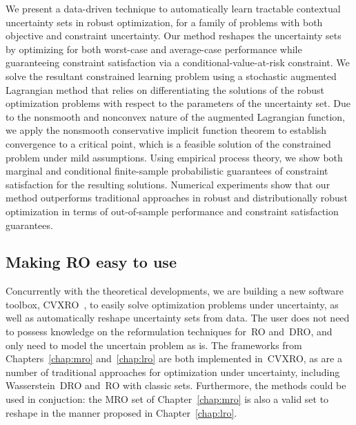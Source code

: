 We present a data-driven technique to automatically learn tractable contextual uncertainty sets in robust optimization, for a family of problems with both objective and constraint uncertainty. 
Our method reshapes the uncertainty sets by optimizing for both worst-case and average-case performance while guaranteeing constraint satisfaction via a conditional-value-at-risk constraint.
We solve the resultant constrained learning problem using a stochastic augmented Lagrangian method that relies on differentiating the solutions of the robust optimization problems with respect to the parameters of the uncertainty set.
Due to the nonsmooth and nonconvex nature of the augmented Lagrangian function, we apply the nonsmooth conservative implicit function theorem to establish convergence to a critical point, which is a feasible solution of the constrained problem under mild assumptions.
Using empirical process theory, we show both marginal and conditional finite-sample probabilistic guarantees of constraint satisfaction for the resulting solutions.
Numerical experiments show that our method outperforms traditional approaches in robust and distributionally robust optimization in terms of out-of-sample performance and constraint satisfaction guarantees.

\subsection{Making \gls{RO} easy to use}
Concurrently with the theoretical developments, we are building a new software toolbox, \Gls{CVXRO}~\cite{lropt_package}, 
to easily solve optimization problems under uncertainty, as well as automatically reshape uncertainty sets from data. 
The user does not need to possess knowledge on the reformulation techniques for~\gls{RO} and~\gls{DRO}, and only need to model the uncertain problem as is. 
The frameworks from Chapters~\ref{chap:mro} and~\ref{chap:lro} are both implemented in~\gls{CVXRO}, as are a number of traditional approaches for optimization under uncertainty, including Wasserstein~\gls{DRO} and~\gls{RO} with classic sets. Furthermore, the methods could be used in conjuction: the \gls{MRO} set of Chapter~\ref{chap:mro} is also a valid set to reshape in the manner proposed in Chapter~\ref{chap:lro}.

